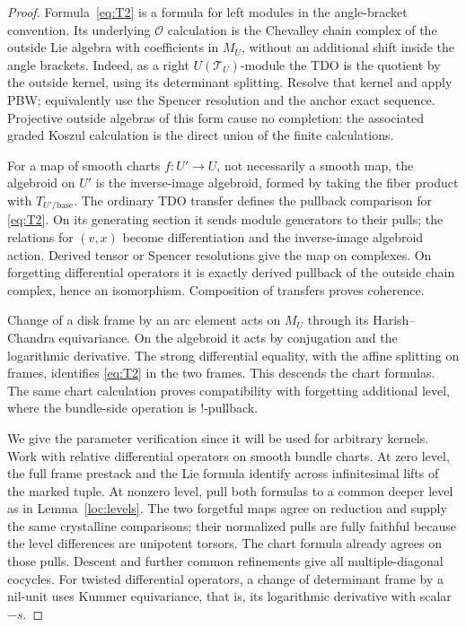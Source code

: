 \documentclass[11pt]{article}
\numberwithin{equation}{section}
\theoremstyle{definition}
\theoremstyle{remark}
\begin{document}
\begin{proof}
Formula~\eqref{eq:T2} is a formula for left modules in the
angle-bracket convention.  Its underlying $\mathcal O$ calculation is
the Chevalley chain complex of the outside Lie algebra with
coefficients in $M_U$, without an additional shift inside the
angle brackets.  Indeed, as a right $U(\mathcal T_U)$-module the TDO is
the quotient by the outside kernel, using its determinant splitting.
Resolve that kernel and apply PBW; equivalently use the Spencer
resolution and the anchor exact sequence.  Projective outside
algebras of this form cause no completion: the associated graded Koszul
calculation is the direct union of the finite calculations.

For a map of smooth charts $f:U'\to U$, not necessarily a smooth map,
the algebroid on $U'$ is the inverse-image algebroid, formed by taking
the fiber product with $T_{U'/\mathrm{base}}$.  The ordinary TDO
transfer defines the pullback comparison for \eqref{eq:T2}.  On its
generating section it sends module generators to their pulls; the
relations for $(v,x)$ become differentiation and the inverse-image
algebroid action.  Derived tensor or Spencer resolutions give the
map on complexes.  On forgetting differential operators it is exactly
derived pullback of the outside chain complex, hence an isomorphism.
Composition of transfers proves coherence.

Change of a disk frame by an arc element acts on $M_U$ through its
Harish--Chandra equivariance.  On the algebroid it acts by conjugation
and the logarithmic derivative.  The strong differential equality,
with the affine splitting on frames, identifies \eqref{eq:T2} in the
two frames.  This descends the chart formulas.  The same chart
calculation proves compatibility with forgetting additional level,
where the bundle-side operation is $!$-pullback.

We give the parameter verification since it will be used for arbitrary
kernels.  Work with relative differential operators on smooth bundle
charts.  At zero level, the full frame prestack and the Lie formula
identify across infinitesimal lifts of the marked tuple.  At nonzero
level, pull both formulas to a common deeper level as in
Lemma~\ref{loc:levels}.  The two forgetful maps agree on reduction and
supply the same crystalline comparisons; their normalized pulls are
fully faithful because the level differences are unipotent torsors.
The chart formula already agrees on those pulls.  Descent and further
common refinements give all multiple-diagonal cocycles.  For twisted
differential operators, a change of determinant frame by a nil-unit
uses Kummer equivariance, that is, its logarithmic derivative with
scalar $-s$.


\end{proof}
\end{document}
